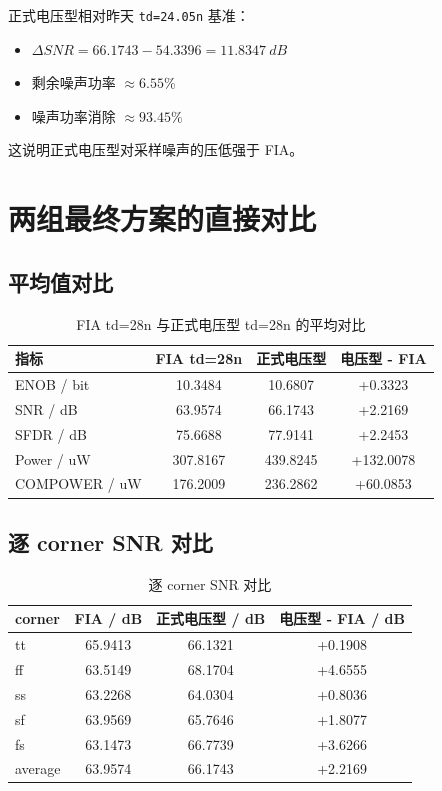 \documentclass[12pt,a4paper]{ctexart}
\begin{document}
正式电压型相对昨天 \texttt{td=24.05n} 基准：

\begin{itemize}
  \item $\Delta SNR = 66.1743 - 54.3396 = \SI{11.8347}{dB}$
  \item 剩余噪声功率 $\approx 6.55\%$
  \item 噪声功率消除 $\approx 93.45\%$
\end{itemize}

这说明正式电压型对采样噪声的压低强于 FIA。

\section{两组最终方案的直接对比}

\subsection{平均值对比}

\begin{table}[H]
\centering
\caption{FIA td=28n 与正式电压型 td=28n 的平均对比}
\begin{tabular}{lccc}
\toprule
指标 & FIA td=28n & 正式电压型 & 电压型 - FIA \\
\midrule
ENOB / bit & 10.3484 & 10.6807 & +0.3323 \\
SNR / dB & 63.9574 & 66.1743 & +2.2169 \\
SFDR / dB & 75.6688 & 77.9141 & +2.2453 \\
Power / uW & 307.8167 & 439.8245 & +132.0078 \\
COMPOWER / uW & 176.2009 & 236.2862 & +60.0853 \\
\bottomrule
\end{tabular}
\end{table}

\subsection{逐 corner SNR 对比}

\begin{table}[H]
\centering
\caption{逐 corner SNR 对比}
\begin{tabular}{lccc}
\toprule
corner & FIA / dB & 正式电压型 / dB & 电压型 - FIA / dB \\
\midrule
tt & 65.9413 & 66.1321 & +0.1908 \\
ff & 63.5149 & 68.1704 & +4.6555 \\
ss & 63.2268 & 64.0304 & +0.8036 \\
sf & 63.9569 & 65.7646 & +1.8077 \\
fs & 63.1473 & 66.7739 & +3.6266 \\
average & 63.9574 & 66.1743 & +2.2169 \\
\bottomrule
\end{tabular}
\end{table}
\end{document}

